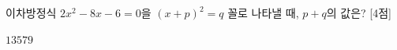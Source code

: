이차방정식 $2x^2-8x-6=0$을 $(x+p)^2=q$ 꼴로 나타낼 때, $p+q$의 값은?  \mbox{[4점]}
\begin{choices32}{$1$}{$3$}{$5$}{$7$}{$9$}\end{choices32}
